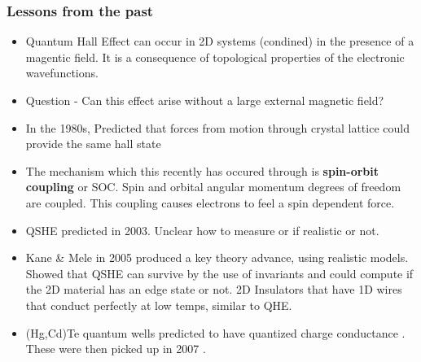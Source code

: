 \documentclass{article} %
\begin{document}
\subsubsection{Lessons from the past}
\begin{itemize}
	\item Quantum Hall Effect can occur in 2D systems (condined) in the presence of a magentic field. It is a consequence of topological properties of the electronic wavefunctions. 
	\item Question - Can this effect arise without a large external magnetic field?
	\item In the 1980s, Predicted that forces from motion through crystal lattice could provide the same hall state \cite{haldane_model_1988}
	\item The mechanism which this recently has occured through is \textbf{spin-orbit coupling} or SOC. Spin and orbital angular momentum degrees of freedom are coupled. This coupling causes electrons to feel a spin dependent force.
	\item QSHE predicted in 2003. Unclear how to measure or if realistic or not. \cite{murakami_dissipationless_2003, murakami_spin-hall_2004}
	\item Kane \& Mele in 2005 produced a key theory advance, using realistic models. Showed that QSHE can survive by the use of invariants and could compute if the 2D material has an edge state or not. 2D Insulators that have 1D wires that conduct perfectly at low temps, similar to QHE. \cite{kane_z_2005}
	\item (Hg,Cd)Te quantum wells predicted to have quantized charge conductance  \cite{bernevig_quantum_2006}. These were then picked up in 2007 \cite{konig_quantum_2007}.
\end{itemize}
\end{document}

